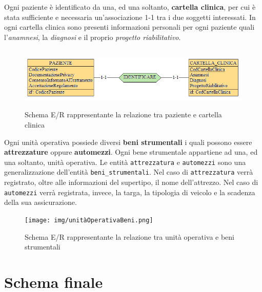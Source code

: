 \documentclass[a4paper, 12pt]{report}
\begin{document}
\noindent
Ogni paziente è identificato da una, ed una soltanto, \textbf{cartella clinica}, per cui è stata sufficiente e necessaria un'associazione
1-1 tra i due soggetti interessati. In ogni cartella clinica sono presenti informazioni personali per ogni paziente quali l'\textit{anamnesi},
la \textit{diagnosi} e il proprio \textit{progetto riabilitativo}. 

\begin{figure}[H]
        \centering
        \includegraphics[height=3cm]{img/pazienteCartella.png}
        \caption{Schema E/R rappresentante la relazione tra paziente e cartella clinica}
\end{figure}

\noindent
Ogni unità operativa possiede diversi \textbf{beni strumentali} i quali possono essere \textbf{attrezzature} oppure \textbf{automezzi}.
Ogni bene strumentale appartiene ad una, ed una soltanto, unità operativa. Le entità \texttt{attrezzatura} e \texttt{automezzi} sono una generalizzazione
dell'entità \texttt{beni\_strumentali}. Nel caso di \texttt{attrezzatura} verrà registrato, oltre alle informazioni del supertipo, il nome dell'attrezzo.
Nel caso di \texttt{automezzi} verrà registrata, invece, la targa, la tipologia di veicolo e la scadenza della sua assicurazione.

\begin{figure}[H]
        \centering
        \texttt{[image: img/unitàOperativaBeni.png]}
        \caption{Schema E/R rappresentante la relazione tra unità operativa e beni strumentali}
\end{figure}

\section{Schema finale}
\end{document}
